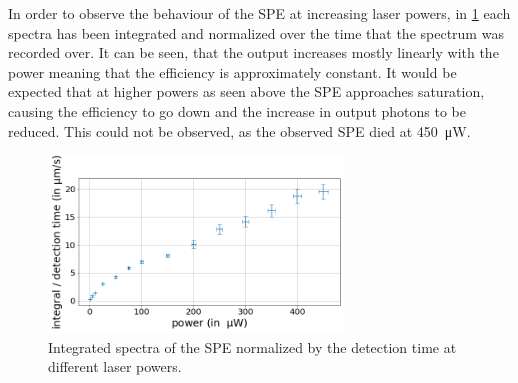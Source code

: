 In order to observe the behaviour of the SPE at increasing laser powers, in \cref{fig_spe_integrals} each spectra has been integrated and normalized over the time that the spectrum was recorded over. %
It can be seen, that the output increases mostly linearly with the power meaning that the efficiency is approximately constant.
It would be expected that at higher powers as seen above the SPE approaches saturation, causing the efficiency to go down and the increase in output photons to be reduced.
This could not be observed, as the observed SPE died at \SI{450}{\micro W}.

\begin{figure}[H]
    \centering
    \includegraphics[width=0.7\textwidth]{img/output_t2/integrals.png}
    \caption{Integrated spectra of the SPE normalized by the detection time at different laser powers.}
    \label{fig_spe_integrals}
\end{figure}
